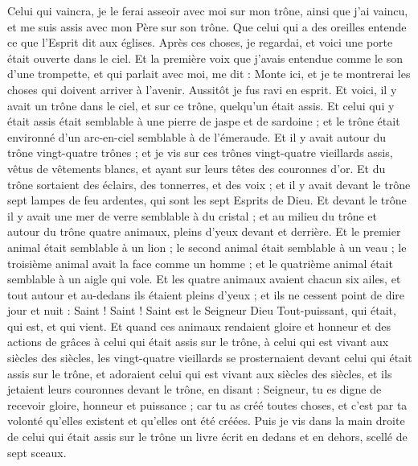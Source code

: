 \begin{multicols}{2}
Celui qui vaincra, je le ferai asseoir avec moi sur mon trône, ainsi que j'ai vaincu, et me suis assis avec mon Père sur son trône.
Que celui qui a des oreilles entende ce que l'Esprit dit aux églises.
\VerseOne{}Après ces choses, je regardai, et voici une porte était ouverte dans le ciel. Et la première voix que j'avais entendue comme le son d'une trompette, et qui parlait avec moi, me dit : Monte ici, et je te montrerai les choses qui doivent arriver à l'avenir.
Aussitôt je fus ravi en esprit. Et voici, il y avait un trône dans le ciel, et sur ce trône, quelqu'un était assis.
Et celui qui y était assis était semblable à une pierre de jaspe et de sardoine ; et le trône était environné d’un arc-en-ciel semblable à de l’émeraude.
Et il y avait autour du trône vingt-quatre trônes ; et je vis sur ces trônes vingt-quatre vieillards assis, vêtus de vêtements blancs, et ayant sur leurs têtes des couronnes d'or.
Et du trône sortaient des éclairs, des tonnerres, et des voix ; et il y avait devant le trône sept lampes de feu ardentes, qui sont les sept Esprits de Dieu.
Et devant le trône il y avait une mer de verre semblable à du cristal ; et au milieu du trône et autour du trône quatre animaux, pleins d'yeux devant et derrière.
Et le premier animal était semblable à un lion ; le second animal était semblable à un veau ; le troisième animal avait la face comme un homme ; et le quatrième animal était semblable à un aigle qui vole.
Et les quatre animaux avaient chacun six ailes, et tout autour et au-dedans ils étaient pleins d'yeux ; et ils ne cessent point de dire jour et nuit : Saint ! Saint ! Saint est le Seigneur Dieu Tout-puissant, qui était, qui est, et qui vient.
Et quand ces animaux rendaient gloire et honneur et des actions de grâces à celui qui était assis sur le trône, à celui qui est vivant aux siècles des siècles,
les vingt-quatre vieillards se prosternaient devant celui qui était assis sur le trône, et adoraient celui qui est vivant aux siècles des siècles, et ils jetaient leurs couronnes devant le trône, en disant :
Seigneur, tu es digne de recevoir gloire, honneur et puissance ; car tu as créé toutes choses, et c'est par ta volonté qu'elles existent et qu'elles ont été créées.
\VerseOne{}Puis je vis dans la main droite de celui qui était assis sur le trône un livre écrit en dedans et en dehors, scellé de sept sceaux.

\end{multicols}
